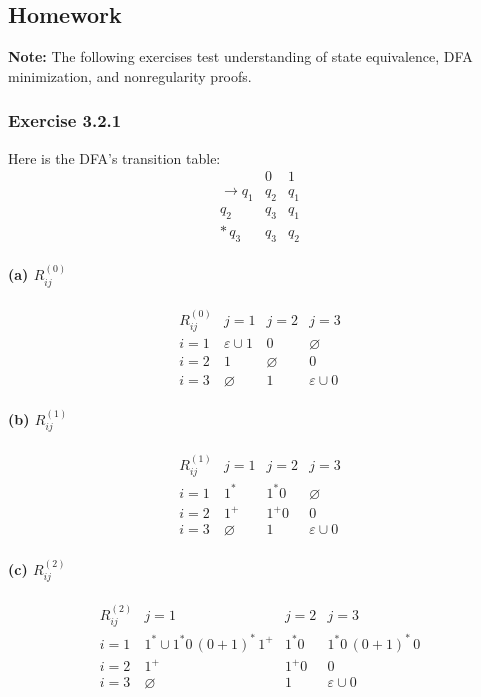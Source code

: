\documentclass{article}
\theoremstyle{theorem}
\theoremstyle{definition}
\theoremstyle{remark}
\begin{document}
\subsection{Homework}
\textbf{Note:} The following exercises test understanding of state equivalence, DFA minimization, and nonregularity proofs.

\subsubsection*{Exercise 3.2.1}
Here is the DFA’s transition table:
\[
\begin{array}{c|cc}
     &0&1\\\hline
\to q_1 & q_2 & q_1\\
      q_2 & q_3 & q_1\\
*\,q_3 & q_3 & q_2
\end{array}
\]
\paragraph{(a) \(R_{ij}^{(0)}\)}
\[
\begin{array}{c|ccc}
R_{ij}^{(0)} & j=1 & j=2 & j=3\\\hline
i=1 & \varepsilon\cup1 & 0 & \varnothing\\
i=2 & 1 & \varnothing & 0\\
i=3 & \varnothing & 1 & \varepsilon\cup0
\end{array}
\]
\paragraph{(b) \(R_{ij}^{(1)}\)}
\[
\begin{array}{c|ccc}
R_{ij}^{(1)} & j=1 & j=2 & j=3\\\hline
i=1 & 1^* & 1^*0 & \varnothing\\
i=2 & 1^+ & 1^+0 & 0\\
i=3 & \varnothing & 1 & \varepsilon\cup0
\end{array}
\]
\paragraph{(c) \(R_{ij}^{(2)}\)}
\[
\begin{array}{c|ccc}
R_{ij}^{(2)} & j=1 & j=2 & j=3\\\hline
i=1 & 1^*\cup1^*0\,(0+1)^*\,1^+ 
      & 1^*0 
      & 1^*0\,(0+1)^*\,0\\
i=2 & 1^+ & 1^+0 & 0\\
i=3 & \varnothing & 1 & \varepsilon\cup0
\end{array}
\]
\end{document}

